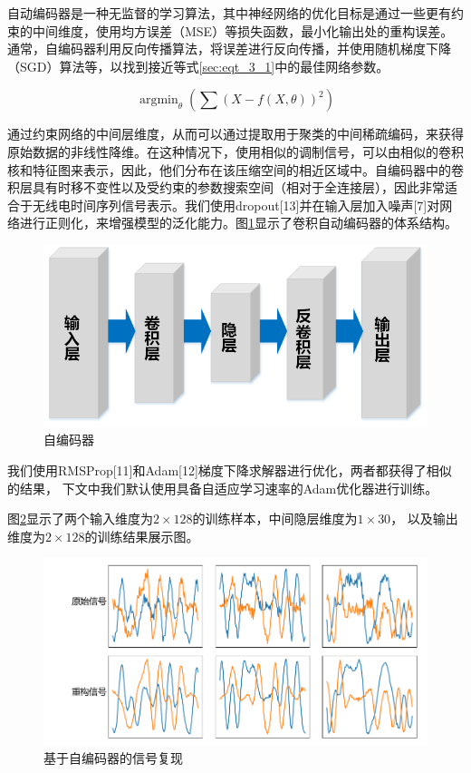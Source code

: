 自动编码器是一种无监督的学习算法，其中神经网络的优化目标是通过一些更有约束的中间维度，使用均方误差（MSE）等损失函数，最小化输出处的重构误差。通常，自编码器利用反向传播算法，将误差进行反向传播，并使用随机梯度下降（SGD）算法等，以找到接近等式\ref{sec:eqt_3_1}中的最佳网络参数。

\begin{equation}\label{sec:eqt_3_1}
	\mathop{\arg\min}_{\theta}(\sum(X − f (X,\theta))^2)
\end{equation}

通过约束网络的中间层维度，从而可以通过提取用于聚类的中间稀疏编码，来获得原始数据的非线性降维。在这种情况下，使用相似的调制信号，可以由相似的卷积核和特征图来表示，因此，他们分布在该压缩空间的相近区域中。自编码器中的卷积层具有时移不变性以及受约束的参数搜索空间（相对于全连接层），因此非常适合于无线电时间序列信号表示。我们使用dropout[13]并在输入层加入噪声[7]对网络进行正则化，来增强模型的泛化能力。图\ref{sec:fig_3_4}显示了卷积自动编码器的体系结构。\par

\begin{figure}[!h]
	\centering
	\includegraphics[scale=0.6]{figures/chapter_3/fig_3_4}
	\caption{自编码器}	\label{sec:fig_3_4}
\end{figure}

我们使用RMSProp[11]和Adam[12]梯度下降求解器进行优化，两者都获得了相似的结果，
下文中我们默认使用具备自适应学习速率的Adam优化器进行训练。\par

图\ref{sec:fig_3_5}显示了两个输入维度为$2 \times 128$的训练样本，中间隐层维度为$1 \times 30$，
以及输出维度为$2 \times 128$的训练结果展示图。\par
\begin{figure}[!h]
	\centering
	\includegraphics[scale=0.6]{figures/chapter_3/fig_3_5}
	\caption{基于自编码器的信号复现}	\label{sec:fig_3_5}
\end{figure} 

